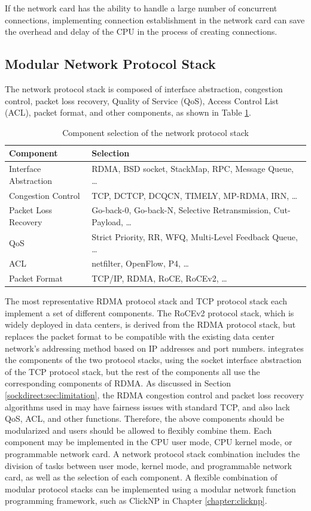 If the network card has the ability to handle a large number of concurrent connections, implementing connection establishment in the network card can save the overhead and delay of the CPU in the process of creating connections.

\subsection{Modular Network Protocol Stack}

The network protocol stack is composed of interface abstraction, congestion control, packet loss recovery, Quality of Service (QoS), Access Control List (ACL), packet format, and other components, as shown in Table \ref{socksdirect:tab:network-stack-components}.

\begin{table}[htbp]
	\centering
	\caption{Component selection of the network protocol stack}
	\small
	\begin{tabular}{l|l}
		\hline
		Component & Selection \\
		\hline
		Interface Abstraction & RDMA, BSD socket, StackMap, RPC, Message Queue, \ldots \\
		Congestion Control & TCP, DCTCP, DCQCN, TIMELY, MP-RDMA, IRN, \ldots \\
		Packet Loss Recovery & Go-back-0, Go-back-N, Selective Retransmission, Cut-Payload, \ldots \\
		QoS & Strict Priority, RR, WFQ, Multi-Level Feedback Queue, \ldots \\
		ACL & netfilter, OpenFlow, P4, \ldots \\
		Packet Format & TCP/IP, RDMA, RoCE, RoCEv2, \ldots \\
		\hline
	\end{tabular}
	\label{socksdirect:tab:network-stack-components}
\end{table}

The most representative RDMA protocol stack and TCP protocol stack each implement a set of different components. The RoCEv2 protocol stack, which is widely deployed in data centers, is derived from the RDMA protocol stack, but replaces the packet format to be compatible with the existing data center network's addressing method based on IP addresses and port numbers. \sys{} integrates the components of the two protocol stacks, using the socket interface abstraction of the TCP protocol stack, but the rest of the components all use the corresponding components of RDMA. As discussed in Section \ref{sockdirect:sec:limitation}, the RDMA congestion control and packet loss recovery algorithms used in \sys{} may have fairness issues with standard TCP, and also lack QoS, ACL, and other functions. Therefore, the above components should be modularized and users should be allowed to flexibly combine them. Each component may be implemented in the CPU user mode, CPU kernel mode, or programmable network card. A network protocol stack combination includes the division of tasks between user mode, kernel mode, and programmable network card, as well as the selection of each component. A flexible combination of modular protocol stacks can be implemented using a modular network function programming framework, such as ClickNP in Chapter \ref{chapter:clicknp}.

